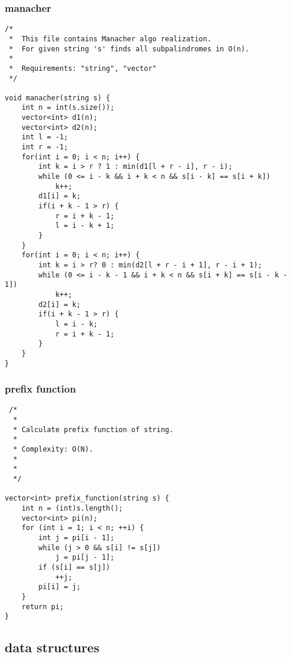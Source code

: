 \subsubsection{manacher}
\begin{lstlisting}
/*
 *  This file contains Manacher algo realization.
 *  For given string 's' finds all subpalindromes in O(n).
 *
 *  Requirements: "string", "vector"
 */

void manacher(string s) {
    int n = int(s.size());
    vector<int> d1(n);
    vector<int> d2(n);
    int l = -1;
    int r = -1;
    for(int i = 0; i < n; i++) {
        int k = i > r ? 1 : min(d1[l + r - i], r - i);
        while (0 <= i - k && i + k < n && s[i - k] == s[i + k])
            k++;
        d1[i] = k;
        if(i + k - 1 > r) {
            r = i + k - 1;
            l = i - k + 1;
        }
    }
    for(int i = 0; i < n; i++) {
        int k = i > r? 0 : min(d2[l + r - i + 1], r - i + 1);
        while (0 <= i - k - 1 && i + k < n && s[i + k] == s[i - k - 1])
            k++;
        d2[i] = k;
        if(i + k - 1 > r) {
            l = i - k;
            r = i + k - 1;
        }
    }
}
\end{lstlisting}
\subsubsection{prefix function}
\begin{lstlisting}
 /*
  *
  * Calculate prefix function of string.
  *
  * Complexity: O(N).
  *
  *
  */

vector<int> prefix_function(string s) {
	int n = (int)s.length();
	vector<int> pi(n);
	for (int i = 1; i < n; ++i) {
		int j = pi[i - 1];
		while (j > 0 && s[i] != s[j])
			j = pi[j - 1];
		if (s[i] == s[j])
            ++j;
		pi[i] = j;
	}
	return pi;
}
\end{lstlisting}
\subsection{data structures}
